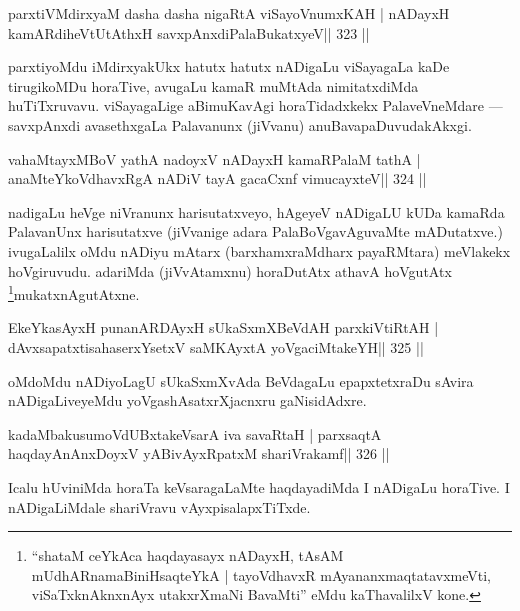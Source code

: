 
\begin{shl}
parxtiVMdirxyaM dasha dasha nigaRtA viSayoVnumxKAH |
nADayxH kamARdiheVtUtAthxH savxpAnxdiPalaBukatxyeV\hfill || 323 ||
\end{shl}

\begin{artha}
parxtiyoMdu iMdirxyakUkx hatutx hatutx nADigaLu viSayagaLa kaDe  tirugikoMDu horaTive, avugaLu kamaR muMtAda nimitatxdiMda huTiTxruvavu. viSayagaLige aBimuKavAgi horaTidadxkekx PalaveVneMdare  {\rm ---}  savxpAnxdi avasethxgaLa Palavanunx (jiVvanu) anuBavapaDuvudakAkxgi.
\end{artha}

\begin{shl}
vahaMtayxMBoV yathA nadoyxV nADayxH kamaRPalaM tathA |
anaMteYkoVdhavxRgA nADiV tayA gacaCxnf vimucayxteV\hfill || 324 ||
\end{shl}

\begin{artha}
nadigaLu heVge niVranunx harisutatxveyo, hAgeyeV nADigaLU kUDa kamaRda 
PalavanUnx harisutatxve (jiVvanige adara PalaBoVgavAguvaMte 
mADutatxve.) ivugaLalilx oMdu nADiyu mAtarx (barxhamxraMdharx 
payaRMtara) meVlakekx hoVgiruvudu. adariMda (jiVvAtamxnu) horaDutAtx 
athavA hoVgutAtx \footnote[5]{``shataM ceYkAca haqdayasayx nADayxH, 
tAsAM mUdhARnamaBiniHsaqteYkA | tayoVdhavxR mAyananxmaqtatavxmeVti, 
viSaTxknAknxnAyx utakxrXmaNi BavaMti'' eMdu kaThavalilxV kone.}mukatxnAgutAtxne.
\end{artha}

\begin{shl}
EkeYkasAyxH punanARDAyxH sUkaSxmXBeVdAH parxkiVtiRtAH |
dAvxsapatxtisahaserxYsetxV saMKAyxtA yoVgaciMtakeYH\hfill || 325 ||
\end{shl}

\begin{artha}\footnotemark[5]oMdoMdu nADiyoLagU sUkaSxmXvAda BeVdagaLu epapxtetxraDu sAvira nADigaLiveyeMdu yoVgashAsatxrXjacnxru gaNisidAdxre.
\end{artha}


\begin{shl}
kadaMbakusumoVdUBxtakeVsarA iva savaRtaH |
parxsaqtA haqdayAnAnxDoyxV yABivAyxRpatxM shariVrakamf\hfill || 326 ||
\end{shl}

\begin{artha}
Icalu hUviniMda horaTa keVsaragaLaMte haqdayadiMda I nADigaLu horaTive. I nADigaLiMdale shariVravu vAyxpisalapxTiTxde.
\end{artha}

